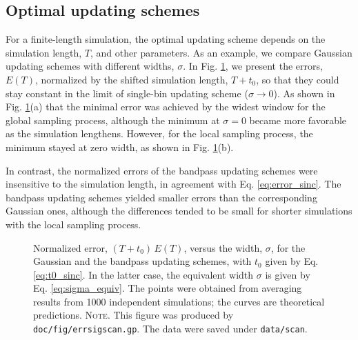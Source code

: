 \documentclass[reprint, superscriptaddress, floatfix]{revtex4-1}
\newcommand{\note}[1]{{\color{DarkGreen}\footnotesize \textsc{Note.} #1}}
\newcommand{\Err}{E}
\begin{document}
\subsection{\label{sec:results_cmpschemes}
Optimal updating schemes}



For a finite-length simulation,
the optimal updating scheme
depends on the simulation length, $T$,
and other parameters.
%
As an example,
we compare Gaussian updating schemes
with different widths, $\sigma$.
%
In Fig. \ref{fig:errsigscan},
we present the errors, $\Err(T)$,
normalized by the shifted simulation length, $T+t_0$,
so that they could
stay constant in the limit of single-bin updating scheme
($\sigma \to 0$).
%
As shown in Fig. \ref{fig:errsigscan}(a)
that the minimal error was achieved
by the widest window %
for the global sampling process,
%
although
the minimum at $\sigma = 0$ became more favorable
as the simulation lengthens.
%
However,
for the local sampling process,
the minimum stayed at zero width,
as shown in Fig. \ref{fig:errsigscan}(b).


In contrast,
the normalized errors of the bandpass updating schemes
were insensitive to the simulation length,
in agreement with Eq. \eqref{eq:error_sinc}.
%
The bandpass updating schemes
yielded smaller errors than
the corresponding Gaussian ones,
although the differences tended to
be small for shorter simulations
with the local sampling process.



\begin{figure}[h]
\begin{center}
  \caption{
    \label{fig:errsigscan}
    Normalized error, $(T + t_0) \, \Err(T)$,
    versus the width, $\sigma$,
    for the Gaussian
    and the bandpass updating schemes,
    with $t_0$ given by Eq. \eqref{eq:t0_sinc}.
    In the latter case,
    the equivalent width
    $\sigma$ is given by Eq. \eqref{eq:sigma_equiv}.
    The points were obtained from averaging results
    from 1000 independent simulations;
    the curves are theoretical predictions.
    \note{This figure was produced by
      \texttt{doc/fig/errsigscan.gp}.
      The data were saved under
      \texttt{data/scan}.
    }%
  }
\end{center}
\end{figure}
\end{document}
